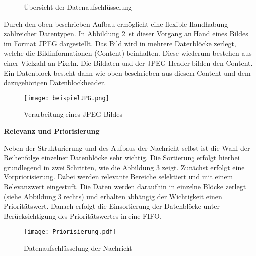 \begin{figure}[H]
  \centering
  \hfill
  \caption{Übersicht der Datenaufschlüsselung}
  \label{fig:uebersichtdatenaufschluesselung}
\end{figure}

Durch den oben beschrieben Aufbau ermöglicht eine flexible Handhabung
zahlreicher Datentypen. In Abbildung \ref{fig:beispielJPG} ist dieser Vorgang an
Hand eines Bildes im Format JPEG dargestellt. Das Bild wird in mehrere
Datenblöcke zerlegt, welche die Bildinformationen (Content) beinhalten.
Diese wiederum bestehen aus einer Vielzahl an Pixeln.
Die Bildaten und der JPEG-Header bilden den Content. Ein Datenblock besteht dann
wie oben beschrieben aus diesem Content und dem dazugehörigen Datenblockheader.

\begin{figure}[H]
	\centering
	\texttt{[image: beispielJPG.png]}
	\caption{Verarbeitung eines JPEG-Bildes}
	\label{fig:beispielJPG}
\end{figure}

\textbf{Relevanz und Priorisierung}

Neben der Strukturierung und des Aufbaus der Nachricht selbst ist die
Wahl der Reihenfolge einzelner Datenblöcke sehr wichtig. Die Sortierung erfolgt
hierbei grundlegend in zwei Schritten, wie die Abbildung \ref{fig:priorisierungen}
zeigt.
Zunächst erfolgt eine Vorpriorisierung. Dabei werden relevante Bereiche
selektiert und mit einem Relevanzwert eingestuft. Die
Daten werden daraufhin in einzelne Blöcke zerlegt (siehe Abbildung
\ref{fig:priorisierungen} rechts) und erhalten abhängig der Wichtigkeit einen
Prioritätswert. Danach erfolgt die Einsortierung der Datenblöcke unter
Berücksichtigung des Prioritätswertes in eine \gls{FIFO}.

\begin{figure}[H]
	\centering
	\texttt{[image: Priorisierung.pdf]}
	\caption{Datenaufschlüsselung der Nachricht}
	\label{fig:priorisierungen}
\end{figure}

